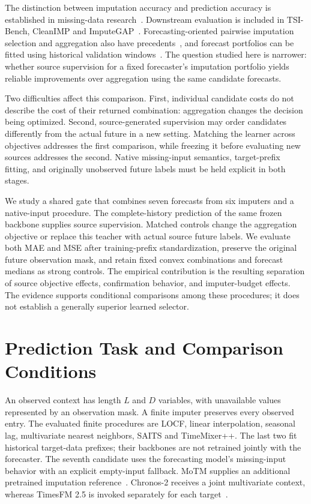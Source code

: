 \documentclass{article}
\begin{document}
The distinction between imputation accuracy and prediction accuracy is established in missing-data research~\citep{lemorvan2021good}. Downstream evaluation is included in TSI-Bench, CleanIMP and ImputeGAP~\citep{du2024tsibench,cleanimp,nater2025imputegap}. Forecasting-oriented pairwise imputation selection and aggregation also have precedents~\citep{utama2026duel}, and forecast portfolios can be fitted using historical validation windows~\citep{kayaalp2025chroma}. The question studied here is narrower: whether source supervision for a fixed forecaster's imputation portfolio yields reliable improvements over aggregation using the same candidate forecasts.

Two difficulties affect this comparison. First, individual candidate costs do not describe the cost of their returned combination: aggregation changes the decision being optimized. Second, source-generated supervision may order candidates differently from the actual future in a new setting. Matching the learner across objectives addresses the first comparison, while freezing it before evaluating new sources addresses the second. Native missing-input semantics, target-prefix fitting, and originally unobserved future labels must be held explicit in both stages.

We study a shared gate that combines seven forecasts from six imputers and a native-input procedure. The complete-history prediction of the same frozen backbone supplies source supervision. Matched controls change the aggregation objective or replace this teacher with actual source future labels. We evaluate both MAE and MSE after training-prefix standardization, preserve the original future observation mask, and retain fixed convex combinations and forecast medians as strong controls. The empirical contribution is the resulting separation of source objective effects, confirmation behavior, and imputer-budget effects. The evidence supports conditional comparisons among these procedures; it does not establish a generally superior learned selector.

\section{Prediction Task and Comparison Conditions}
\label{sec:setting}

An observed context has length $L$ and $D$ variables, with unavailable values represented by an observation mask. A finite imputer preserves every observed entry. The evaluated finite procedures are LOCF, linear interpolation, seasonal lag, multivariate nearest neighbors, SAITS and TimeMixer++. The last two fit historical target-data prefixes; their backbones are not retrained jointly with the forecaster. The seventh candidate uses the forecasting model's missing-input behavior with an explicit empty-input fallback. MoTM supplies an additional pretrained imputation reference~\citep{motmsoftware}. Chronos-2 receives a joint multivariate context, whereas TimesFM 2.5 is invoked separately for each target~\citep{ansari2025chronos2,google2025timesfm25}.
\end{document}
